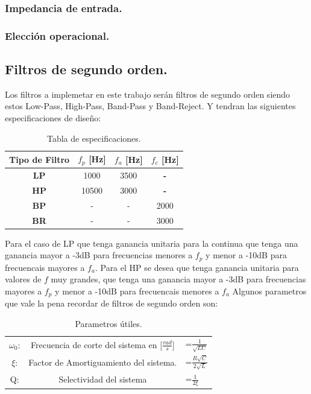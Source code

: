 \documentclass[a4paper]{article}
\begin{document}
\subsubsection{Impedancia de entrada.}

\subsubsection{Elección operacional.}

 \flushleft
\subsection{Filtros de segundo orden.}
Los filtros a implemetar en este trabajo serán filtros de segundo orden siendo estos Low-Pass, High-Pass, Band-Pass y Band-Reject. Y tendran las siguientes especificaciones de diseño:
\begin{table}[H]
\begin{center}
\begin{tabular}{|c|c|c|c|}
\hline
\textbf{Tipo de Filtro} & \textbf{$f_p$ [Hz]} & \textbf{$f_a$ [Hz]} & \textbf{$f_c$ [Hz]} \\ \hline
\textbf{LP}             & 1000                & 3500                & \textbf{-}          \\ \hline
\textbf{HP}             & 10500               & 3000                & \textbf{-}          \\ \hline
\textbf{BP}             & -                   & -                   & 2000                \\ \hline
\textbf{BR}             & -                   & -                   & 3000                \\ \hline
\end{tabular}
\caption{Tabla de especificaciones.}
\label{tab:specs}
\end{center}
\end{table}
Para el caso de LP que tenga ganancia unitaria para la continua que tenga una ganancia mayor a -3dB para frecuencias menores a $f_p$ y menor a -10dB para frecuencais mayores a $f_a$. Para el HP se desea que tenga ganancia unitaria para valores de $f$ muy grandes, que tenga una ganancia mayor a -3dB para frecuencias mayores a $f_p$ y menor a -10dB para frecuencais menores a $f_a$
Algunos parametros que vale la pena recordar de filtros de segundo orden son:
\begin{table}[H]
\begin{center}
\begin{tabular}{c|cl}
$\omega_0$: & Frecuencia de corte del sistema en [$\frac{rad}{s}$] & =$\frac{1}{\sqrt{LC}}$         \\
$\xi$:      & Factor de Amortiguamiento del sistema.               & =$\frac{R\sqrt{C}}{2\sqrt{L}}$ \\
Q:          & Selectividad del sistema                             & =$\frac{1}{2\xi}$             
\end{tabular}
\end{center}
\caption{Parametros útiles.}
\label{tab:utils}
\end{table}
\end{document}
